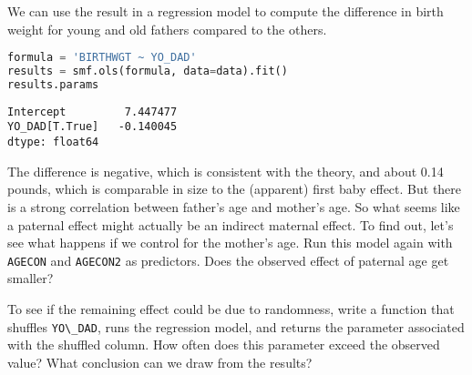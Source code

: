 \pagebreak

We can use the result in a regression model to compute the difference in
birth weight for young and old fathers compared to the others.

\begin{lstlisting}[language=Python,style=source]
formula = 'BIRTHWGT ~ YO_DAD'
results = smf.ols(formula, data=data).fit()
results.params
\end{lstlisting}

\begin{lstlisting}[style=output]
Intercept         7.447477
YO_DAD[T.True]   -0.140045
dtype: float64
\end{lstlisting}

The difference is negative, which is consistent with the theory, and
about 0.14 pounds, which is comparable in size to the (apparent) first
baby effect. But there is a strong correlation between father's age and
mother's age. So what seems like a paternal effect might actually be an
indirect maternal effect. To find out, let's see what happens if we
control for the mother's age. Run this model again with
\passthrough{\lstinline!AGECON!} and \passthrough{\lstinline!AGECON2!}
as predictors. Does the observed effect of paternal age get smaller?

To see if the remaining effect could be due to randomness, write a
function that shuffles \passthrough{\lstinline!YO\_DAD!}, runs the
regression model, and returns the parameter associated with the shuffled
column. How often does this parameter exceed the observed value? What
conclusion can we draw from the results?
